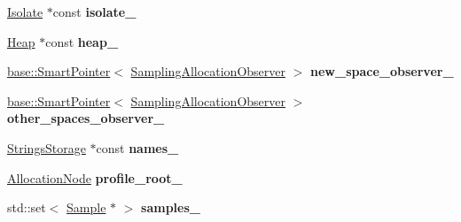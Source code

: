 \begin{DoxyCompactItemize}
\item 
\hyperlink{classv8_1_1internal_1_1_isolate}{Isolate} $\ast$const {\bfseries isolate\+\_\+}\hypertarget{classv8_1_1internal_1_1_sampling_heap_profiler_a438f38c6368b5fcb0682089727294bb8}{}\label{classv8_1_1internal_1_1_sampling_heap_profiler_a438f38c6368b5fcb0682089727294bb8}

\item 
\hyperlink{classv8_1_1internal_1_1_heap}{Heap} $\ast$const {\bfseries heap\+\_\+}\hypertarget{classv8_1_1internal_1_1_sampling_heap_profiler_a16e24bce6829e77398ae4dfbf72ad59d}{}\label{classv8_1_1internal_1_1_sampling_heap_profiler_a16e24bce6829e77398ae4dfbf72ad59d}

\item 
\hyperlink{classv8_1_1base_1_1_smart_pointer}{base\+::\+Smart\+Pointer}$<$ \hyperlink{classv8_1_1internal_1_1_sampling_allocation_observer}{Sampling\+Allocation\+Observer} $>$ {\bfseries new\+\_\+space\+\_\+observer\+\_\+}\hypertarget{classv8_1_1internal_1_1_sampling_heap_profiler_a9e82eb15f2418409e0fd03f380de8a29}{}\label{classv8_1_1internal_1_1_sampling_heap_profiler_a9e82eb15f2418409e0fd03f380de8a29}

\item 
\hyperlink{classv8_1_1base_1_1_smart_pointer}{base\+::\+Smart\+Pointer}$<$ \hyperlink{classv8_1_1internal_1_1_sampling_allocation_observer}{Sampling\+Allocation\+Observer} $>$ {\bfseries other\+\_\+spaces\+\_\+observer\+\_\+}\hypertarget{classv8_1_1internal_1_1_sampling_heap_profiler_ade8c9fc3d6b79ef4ffd02d09a1b5169b}{}\label{classv8_1_1internal_1_1_sampling_heap_profiler_ade8c9fc3d6b79ef4ffd02d09a1b5169b}

\item 
\hyperlink{classv8_1_1internal_1_1_strings_storage}{Strings\+Storage} $\ast$const {\bfseries names\+\_\+}\hypertarget{classv8_1_1internal_1_1_sampling_heap_profiler_af4d883f295e34ee743a8303b71997f87}{}\label{classv8_1_1internal_1_1_sampling_heap_profiler_af4d883f295e34ee743a8303b71997f87}

\item 
\hyperlink{classv8_1_1internal_1_1_sampling_heap_profiler_1_1_allocation_node}{Allocation\+Node} {\bfseries profile\+\_\+root\+\_\+}\hypertarget{classv8_1_1internal_1_1_sampling_heap_profiler_a8b2ba41d16ada4dce2a3329cb20761cf}{}\label{classv8_1_1internal_1_1_sampling_heap_profiler_a8b2ba41d16ada4dce2a3329cb20761cf}

\item 
std\+::set$<$ \hyperlink{structv8_1_1internal_1_1_sampling_heap_profiler_1_1_sample}{Sample} $\ast$ $>$ {\bfseries samples\+\_\+}\hypertarget{classv8_1_1internal_1_1_sampling_heap_profiler_aee6f9f633f15353705f3768c803533fa}{}\label{classv8_1_1internal_1_1_sampling_heap_profiler_aee6f9f633f15353705f3768c803533fa}


\end{DoxyCompactItemize}

